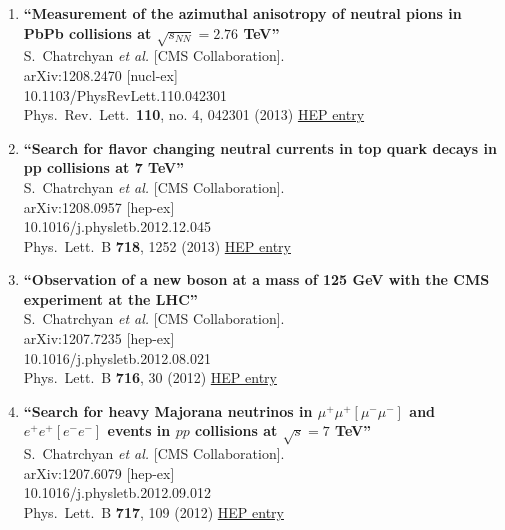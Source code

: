 \documentclass{article}
\begin{document}
\begin{enumerate}
\item%
{\bf ``Measurement of the azimuthal anisotropy of neutral pions in PbPb collisions at $\sqrt{s_{NN}}=2.76$ TeV''}
  \\{}S.~Chatrchyan {\it et al.} [CMS Collaboration].
  \\{}arXiv:1208.2470 [nucl-ex]
    \\{}10.1103/PhysRevLett.110.042301
\\{}Phys.\ Rev.\ Lett.\  {\bf 110}, no. 4, 042301 (2013) %
\href{http://inspirehep.net/record/1127329}{HEP entry}


\item%
{\bf ``Search for flavor changing neutral currents in top quark decays in pp collisions at 7 TeV''}
  \\{}S.~Chatrchyan {\it et al.} [CMS Collaboration].
  \\{}arXiv:1208.0957 [hep-ex]
    \\{}10.1016/j.physletb.2012.12.045
\\{}Phys.\ Lett.\ B {\bf 718}, 1252 (2013) %
\href{http://inspirehep.net/record/1125963}{HEP entry}


\item%
{\bf ``Observation of a new boson at a mass of 125 GeV with the CMS experiment at the LHC''}
  \\{}S.~Chatrchyan {\it et al.} [CMS Collaboration].
  \\{}arXiv:1207.7235 [hep-ex]
    \\{}10.1016/j.physletb.2012.08.021
\\{}Phys.\ Lett.\ B {\bf 716}, 30 (2012) %
\href{http://inspirehep.net/record/1124338}{HEP entry}


\item%
{\bf ``Search for heavy Majorana neutrinos in $\mu^+\mu^+[\mu^-\mu^-]$ and $e^+e^+[e^-e^-]$ events in $pp$ collisions at $\sqrt{s} = 7$ TeV''}
  \\{}S.~Chatrchyan {\it et al.} [CMS Collaboration].
  \\{}arXiv:1207.6079 [hep-ex]
    \\{}10.1016/j.physletb.2012.09.012
\\{}Phys.\ Lett.\ B {\bf 717}, 109 (2012) %
\href{http://inspirehep.net/record/1123803}{HEP entry}



\end{enumerate}
\end{document}
